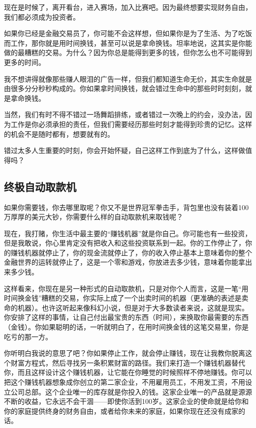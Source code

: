 现在是时候了，离开看台，进入赛场，加入比赛吧。因为最终想要实现财务自由，我们都必须成为投资者。

如果你已经是金融交易员了，你可能不会这样想，但如果你是为了生活、为了吃饭而工作，那你就是用时间换钱，甚至可以说是拿命换钱。坦率地说，这其实是你能做的最糟糕的交易。为什么？因为你总是能得到更多的钱，但你怎么也不可能得到更多的时间。

我不想讲得就像那些赚人眼泪的广告一样，但我们都知道生命无价，其实生命就是由很多分分秒秒构成的。你如果拿时间换钱，就会错过生命中的那些时时刻刻，就是拿命换钱。

当然，我们有时不得不错过一场舞蹈排练，或者错过一次晚上的约会，没办法，因为工作是你必须承担的责任，但我们需要经历那些时刻才能得到珍贵的记忆。这样的机会不是随时都有，想要就有的。

错过太多人生重要的时刻，你会开始怀疑，自己这样工作到底为了什么，这样做值得吗？

\subsection{终极自动取款机}

如果你需要钱，你去哪里取呢？你又不是世界冠军拳击手，背包里也没有装着100万厚厚的美元大钞，你需要什么样的自动取款机来取钱呢？

现在，我打赌，你生活中最主要的“赚钱机器”就是你自己。你可能也有一些投资，但是我敢说，你心里肯定没有把收入和这些投资联系到一起。你的工作停止了，你的赚钱机器就停止了，你的现金流就停止了，你的收入停止基本上意味着你的整个金融世界的运转就停止了，这是一个零和游戏，你放进去多少钱，意味着你能拿出来多少钱。

这样看来，你现在是另一种形式的自动取款机，只是对你个人而言，这是一笔“用时间换金钱”糟糕的交易，你实际上成了一个出卖时间的机器（更准确的表述是卖命的机器）。也许这听起来像科幻小说，但是对于大多数读者来说，这就是现实。你安排了这样的事情，让自己付出最宝贵的东西（时间），来换取你最需要的东西（金钱）。你如果聪明的话，一听就明白了，在用时间换金钱的这笔交易里，你是吃亏的那一方。

你听明白我说的意思了吧？你如果停止工作，就会停止赚钱，现在让我教你脱离这个财富方程式，然后寻找另一条积累财富的路径。我们来打造一个赚钱机器替代你，而且这样设计这个赚钱机器，让它能在你睡觉的时候照样不停地赚钱。你可以把这个赚钱机器想象成你创立的第二家企业，不用雇用员工，不用发工资，不用设立公司总部。这个企业唯一的库存就是你投入的钱。这家企业唯一的产品就是源源不断的收益，它永远不会干涸——即使你活到100岁。这家企业的使命就是给你和你的家庭提供终身的财务自由，或者给你未来的家庭，如果你现在还没有成家的话。


